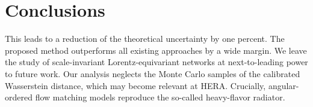 \section{Conclusions}\label{sec:conclusions}

This leads to a reduction of the theoretical uncertainty by one percent.
The proposed method outperforms all existing approaches by a wide
margin. We leave the study of scale-invariant Lorentz-equivariant
networks at next-to-leading power to future work. Our analysis neglects
the Monte Carlo samples of the calibrated Wasserstein distance, which
may become relevant at HERA. Crucially, angular-ordered flow matching
models reproduce the so-called heavy-flavor radiator.

